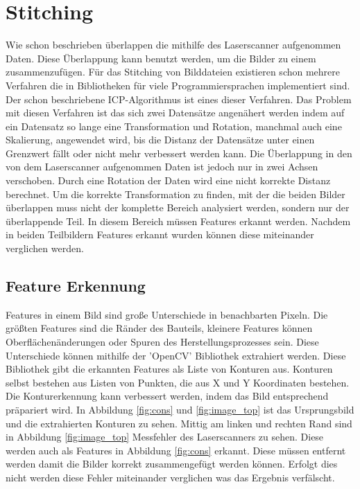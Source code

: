 \documentclass[../main.tex]{subfiles}
\begin{document}
\section{Stitching}

Wie schon beschrieben überlappen die mithilfe des Laserscanner aufgenommen Daten.
Diese Überlappung kann benutzt werden, um die Bilder zu einem zusammenzufügen.
Für das Stitching von Bilddateien existieren schon mehrere Verfahren die in Bibliotheken
für viele Programmiersprachen implementiert sind. Der schon beschriebene ICP-Algorithmus
ist eines dieser Verfahren. Das Problem mit diesen Verfahren ist das sich zwei 
Datensätze angenähert werden indem auf ein Datensatz so lange eine 
Transformation und Rotation, manchmal auch eine Skalierung, angewendet wird, bis
die Distanz der Datensätze unter einen Grenzwert fällt oder nicht mehr verbessert
werden kann. Die Überlappung in den von dem Laserscanner aufgenommen Daten ist jedoch 
nur in zwei Achsen verschoben. Durch eine Rotation der Daten wird eine nicht korrekte 
Distanz berechnet.
Um die korrekte Transformation zu finden, mit der die beiden Bilder überlappen
muss nicht der komplette Bereich analysiert werden, sondern nur der überlappende Teil.
In diesem Bereich müssen Features erkannt werden. 
Nachdem in beiden Teilbildern Features erkannt wurden können diese miteinander
verglichen werden.

\subsection{Feature Erkennung}

Features in einem Bild sind große Unterschiede in benachbarten Pixeln. Die größten
Features sind die Ränder des Bauteils, kleinere Features können Oberflächenänderungen 
oder Spuren des Herstellungsprozesses sein. Diese Unterschiede können mithilfe 
der 'OpenCV' Bibliothek extrahiert werden. Diese Bibliothek gibt die erkannten 
Features als Liste von Konturen aus. Konturen selbst bestehen aus Listen von 
Punkten, die aus X und Y Koordinaten bestehen. Die Konturerkennung kann verbessert 
werden, indem das Bild entsprechend präpariert wird. In Abbildung \ref{fig:cons} und
\ref{fig:image_top} ist das Ursprungsbild und die extrahierten Konturen zu sehen.
Mittig am linken und rechten Rand sind in Abbildung \ref{fig:image_top} 
Messfehler des Laserscanners zu sehen. Diese werden auch als Features in 
Abbildung \ref{fig:cons} erkannt. Diese müssen entfernt werden damit die Bilder 
korrekt zusammengefügt werden können. Erfolgt dies nicht werden diese Fehler miteinander
verglichen was das Ergebnis verfälscht.
\end{document}
